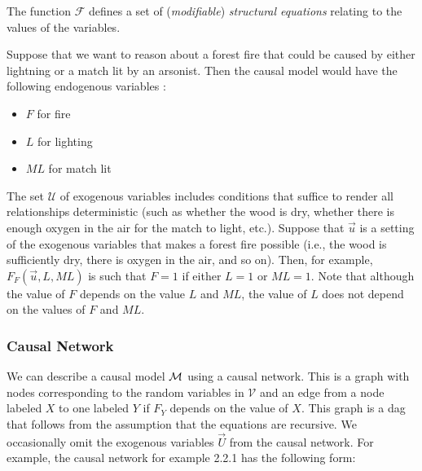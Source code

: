 The function $\mathcal{F}$ defines a set of (\textit{modifiable}) \textit{structural equations} relating to the values of the variables.

\begin{example}
    Suppose that we want to reason about a forest fire that could
    be caused by either lightning or a match lit by an arsonist.
    Then the causal model would have the following endogenous variables :
    \begin{itemize}
        \item $F$ for fire
        \item $L$ for lighting
        \item $ML$ for match lit
    \end{itemize}
    The set $\mathcal{U}$ of exogenous variables includes conditions
    that suffice to render all relationships deterministic (such as
    whether the wood is dry, whether there is enough oxygen in the air
    for the match to light, etc.).
    Suppose that $\vec u$ is a setting of the exogenous variables that
    makes a forest fire possible (i.e., the wood is sufficiently dry,
    there is oxygen in the air, and so on).
    Then, for example, $F_F(\vec u, L, ML)$ is such that $F=1$ if either
    $L=1$ or $ML=1$.
    Note that although the value of $F$ depends on the value $L$ and $ML$, the value of $L$ does not depend on the values of $F$ and $ML$.
\end{example}

\subsubsection{Causal Network}
We can describe a causal model $\mathcal{M}$ using a causal network.
This is a graph with nodes corresponding to the random variables
in $\mathcal{V}$ and an edge from a node labeled $X$ to one
labeled $Y$ if $F_Y$ depends on the value of $X$.
This graph is a dag that follows from the assumption that the
equations are recursive.
We occasionally omit the exogenous variables $\vec U$ from the causal network.
For example, the causal network for example 2.2.1 has the following
form:

\begin{center}
\end{center}

